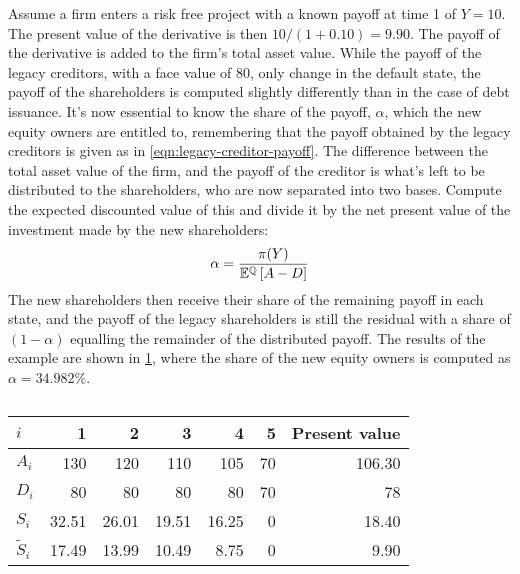 \documentclass[main.tex]{subfiles}
\begin{document}
        Assume a firm enters a risk free project with a known payoff at time 1 of $Y=10$. 
        The present value of the derivative is then $10/(1+0.10)=9.90$. 
        The payoff of the derivative is added to the firm's total asset value. 
        While the payoff of the legacy creditors, with a face value of 80, only change in the default state, the payoff of the shareholders is computed slightly differently than in the case of debt issuance. 
        It's now essential to know the share of the payoff, $\alpha$, which the new equity owners are entitled to, remembering that the payoff obtained by the legacy creditors is given as in \cref{eqn:legacy-creditor-payoff}. 
        The difference between the total asset value of the firm, and the payoff of the creditor is what's left to be distributed to the shareholders, who are now separated into two bases. 
        Compute the expected discounted value of this and divide it by the net present value of the investment made by the new shareholders:
        \begin{equation}
            \alpha = 
                \frac{
                    \pi(Y)
                }{
                    \mathbb{E}^{\mathbb{Q}}\left[A-D\right]
                }
        \end{equation}
        The new shareholders then receive their share of the remaining payoff in each state, and the payoff of the legacy shareholders is still the residual with a share of $(1-\alpha)$ equalling the remainder of the distributed payoff. 
        The results of the example are shown in \cref{tbl:equity-funding-payoff}, where the share of the new equity owners is computed as $\alpha = 34.982\%$.

        \begin{table}[H]
            \centering\begin{tabular}{l|rrrrr||r}
                $i$ & 1 & 2 & 3 & 4 & 5 & Present value \\
                \hline
                $A_{i}$ & 130 & 120 & 110 & 105 & 70 & 106.30 \\
                $D_{i}$ & 80 & 80 & 80 & 80 & 70 & 78 \\
                $S_{i}$ & 32.51 & 26.01 & 19.51 & 16.25 & 0 & 18.40 \\
                $\tilde{S}_{i}$ & 17.49 & 13.99 & 10.49 & 8.75 & 0 & 9.90 \\
            \end{tabular}
            \caption{}
            \label{tbl:equity-funding-payoff}
        \end{table}
\end{document}
